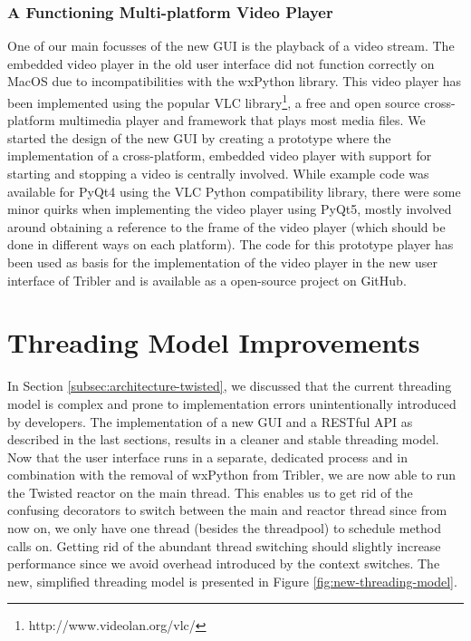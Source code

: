 \subsubsection{\textbf{A Functioning Multi-platform Video Player}}
One of our main focusses of the new GUI is the playback of a video stream. The embedded video player in the old user interface did not function correctly on MacOS due to incompatibilities with the wxPython library. This video player has been implemented using the popular VLC library\footnote{http://www.videolan.org/vlc/}, a free and open source cross-platform multimedia player and framework that plays most media files. We started the design of the new GUI by creating a prototype where the implementation of a cross-platform, embedded video player with support for starting and stopping a video is centrally involved. While example code was available for PyQt4 using the VLC Python compatibility library, there were some minor quirks when implementing the video player using PyQt5, mostly involved around obtaining a reference to the frame of the video player (which should be done in different ways on each platform). The code for this prototype player has been used as basis for the implementation of the video player in the new user interface of Tribler and is available as a open-source project on GitHub\cite{vos2016vlc}.

\section{Threading Model Improvements}
\label{sec:threading-model-improvements}
In Section \ref{subsec:architecture-twisted}, we discussed that the current threading model is complex and prone to implementation errors unintentionally introduced by developers. The implementation of a new GUI and a RESTful API as described in the last sections, results in a cleaner and stable threading model. Now that the user interface runs in a separate, dedicated process and in combination with the removal of wxPython from Tribler, we are now able to run the Twisted reactor on the main thread. This enables us to get rid of the confusing decorators to switch between the main and reactor thread since from now on, we only have one thread (besides the threadpool) to schedule method calls on. Getting rid of the abundant thread switching should slightly increase performance since we avoid overhead introduced by the context switches. The new, simplified threading model is presented in Figure \ref{fig:new-threading-model}.

